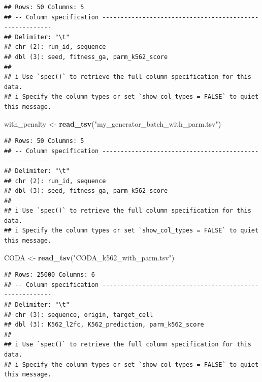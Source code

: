 \documentclass[
]{article}
\newenvironment{Shaded}{\begin{snugshade}}{\end{snugshade}}
\newcommand{\FunctionTok}[1]{\textcolor[rgb]{0.13,0.29,0.53}{\textbf{#1}}}
\newcommand{\NormalTok}[1]{#1}
\newcommand{\OtherTok}[1]{\textcolor[rgb]{0.56,0.35,0.01}{#1}}
\newcommand{\SpecialCharTok}[1]{\textcolor[rgb]{0.81,0.36,0.00}{\textbf{#1}}}
\newcommand{\StringTok}[1]{\textcolor[rgb]{0.31,0.60,0.02}{#1}}
\begin{document}
\begin{verbatim}
## Rows: 50 Columns: 5
## -- Column specification --------------------------------------------------------
## Delimiter: "\t"
## chr (2): run_id, sequence
## dbl (3): seed, fitness_ga, parm_k562_score
## 
## i Use `spec()` to retrieve the full column specification for this data.
## i Specify the column types or set `show_col_types = FALSE` to quiet this message.
\end{verbatim}

\begin{Shaded}
\begin{Highlighting}[]
\NormalTok{with\_penalty }\OtherTok{\textless{}{-}} \FunctionTok{read\_tsv}\NormalTok{(}\StringTok{"my\_generator\_batch\_with\_parm.tsv"}\NormalTok{)}
\end{Highlighting}
\end{Shaded}

\begin{verbatim}
## Rows: 50 Columns: 5
## -- Column specification --------------------------------------------------------
## Delimiter: "\t"
## chr (2): run_id, sequence
## dbl (3): seed, fitness_ga, parm_k562_score
## 
## i Use `spec()` to retrieve the full column specification for this data.
## i Specify the column types or set `show_col_types = FALSE` to quiet this message.
\end{verbatim}

\begin{Shaded}
\begin{Highlighting}[]
\NormalTok{CODA }\OtherTok{\textless{}{-}} \FunctionTok{read\_tsv}\NormalTok{(}\StringTok{"CODA\_k562\_with\_parm.tsv"}\NormalTok{)}
\end{Highlighting}
\end{Shaded}

\begin{verbatim}
## Rows: 25000 Columns: 6
## -- Column specification --------------------------------------------------------
## Delimiter: "\t"
## chr (3): sequence, origin, target_cell
## dbl (3): K562_l2fc, K562_prediction, parm_k562_score
## 
## i Use `spec()` to retrieve the full column specification for this data.
## i Specify the column types or set `show_col_types = FALSE` to quiet this message.
\end{verbatim}

\begin{Shaded}
\end{Shaded}
\end{document}
